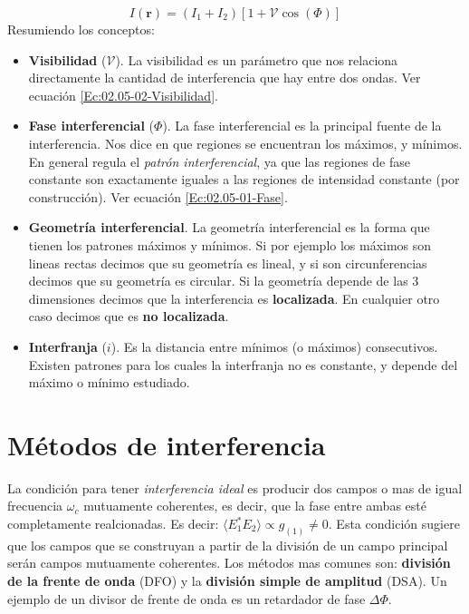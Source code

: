 \documentclass[12pt,a4paper]{book}
\numberwithin{equation}{section}
\numberwithin{figure}{section}
\newcommand{\ccorchetes}[1]{\left[ #1  \right]}
\newcommand{\1}{_{(1)}}
\newcommand{\2}{_{(2)}}
\newcommand{\rn}{\mathbf{r}}
\theoremstyle{definition}
\begin{document}
\begin{equation}
I(\rn) = (I_1 + I_2) \ccorchetes{ 1 + \mathcal{V} \cos (\Phi)}
\end{equation}
Resumiendo los conceptos:

\begin{itemize}
\item \textbf{Visibilidad} ($\mathcal{V}$). La visibilidad es un parámetro que nos relaciona directamente la cantidad de interferencia que hay entre dos ondas. Ver ecuación \ref{Ec:02.05-02-Visibilidad}. 
\item \textbf{Fase interferencial} ($\Phi$). La fase interferencial es la principal fuente de la interferencia. Nos dice en que regiones se encuentran los máximos, y mínimos. En general regula el \textit{patrón interferencial}, ya que las regiones de fase constante son exactamente iguales a las regiones de intensidad constante (por construcción). Ver ecuación \ref{Ec:02.05-01-Fase}. 
\item \textbf{Geometría interferencial}. La geometría interferencial es la forma que tienen los patrones máximos y mínimos. Si por ejemplo los máximos son lineas rectas decimos que su geometría es lineal, y si son circunferencias decimos que su geometría es circular. Si la geometría depende de las 3 dimensiones decimos que la interferencia es \textbf{localizada}. En cualquier otro caso decimos que es \textbf{no localizada}.
\item \textbf{Interfranja} ($i$). Es la distancia entre mínimos (o máximos) consecutivos. Existen patrones para los cuales la interfranja no es constante, y depende del máximo o mínimo estudiado. 
\end{itemize}

\section{Métodos de interferencia}

La condición para tener  \textit{interferencia ideal} es producir dos campos o mas de igual frecuencia $\omega_c$ mutuamente coherentes, es decir, que la fase entre ambas esté completamente realcionadas. Es decir: $\langle E_1^* E_2 \rangle \varpropto g\1 \neq 0$. Esta condición sugiere que los campos que se construyan a partir de la división de un campo principal serán campos mutuamente coherentes. Los métodos mas comunes son: \textbf{división de la frente de onda} (DFO) y la  \textbf{división simple de amplitud} (DSA). Un ejemplo de un divisor de frente de onda es un retardador de fase $\Delta \Phi$.
\end{document}
